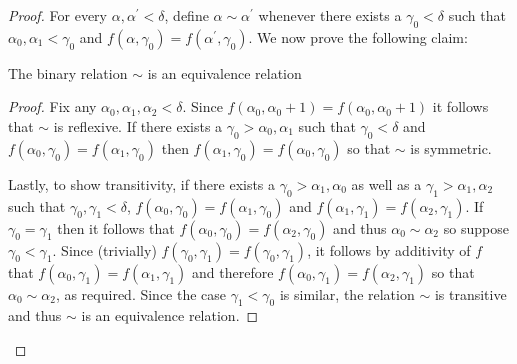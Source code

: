 \begin{proof}
	For every $\alpha,\alpha^\prime<\delta$, define $\alpha\sim\alpha^\prime$ whenever there exists a $\gamma_0<\delta$ such that $\alpha_0,\alpha_1<\gamma_0$ and $f(\alpha,\gamma_0)=f(\alpha^\prime,\gamma_0)$.  We now prove the following claim:
	\begin{claim}
		The binary relation $\sim$ is an equivalence relation
	\end{claim}
	\begin{proof}
		Fix any $\alpha_0,\alpha_1,\alpha_2<\delta$.  Since $f(\alpha_0,\alpha_0+1)=f(\alpha_0,\alpha_0+1)$ it follows that $\sim$ is reflexive.  If there exists a $\gamma_0>\alpha_0,\alpha_1$ such that $\gamma_0<\delta$ and $f(\alpha_0,\gamma_0)=f(\alpha_1,\gamma_0)$ then $f(\alpha_1,\gamma_0)=f(\alpha_0,\gamma_0)$ so that $\sim$ is symmetric.

		Lastly, to show transitivity, if there exists a $\gamma_0>\alpha_1,\alpha_0$ as well as a $\gamma_1>\alpha_1,\alpha_2$ such that $\gamma_0,\gamma_1<\delta$, $f(\alpha_0,\gamma_0)=f(\alpha_1,\gamma_0)$ and $f(\alpha_1,\gamma_1)=f(\alpha_2,\gamma_1)$. If $\gamma_0=\gamma_1$ then it follows that $f(\alpha_0,\gamma_0)=f(\alpha_2,\gamma_0)$ and thus $\alpha_0\sim\alpha_2$ so suppose $\gamma_0<\gamma_1$.  Since (trivially) $f(\gamma_0,\gamma_1)=f(\gamma_0,\gamma_1)$, it follows by additivity of $f$ that $f(\alpha_0,\gamma_1)=f(\alpha_1,\gamma_1)$ and therefore $f(\alpha_0,\gamma_1)=f(\alpha_2,\gamma_1)$ so that $\alpha_0\sim\alpha_2$, as required.  Since the case $\gamma_1<\gamma_0$ is similar, the relation $\sim$ is transitive and thus $\sim$ is an equivalence relation.
	\end{proof}


\end{proof}
